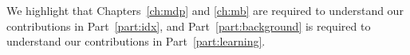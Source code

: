 We highlight that Chapters~\ref{ch:mdp} and \ref{ch:mb} are required to understand our contributions in Part~\ref{part:idx}, and
Part~\ref{part:background} is required to understand our contributions in Part~\ref{part:learning}.

%

\endgroup

